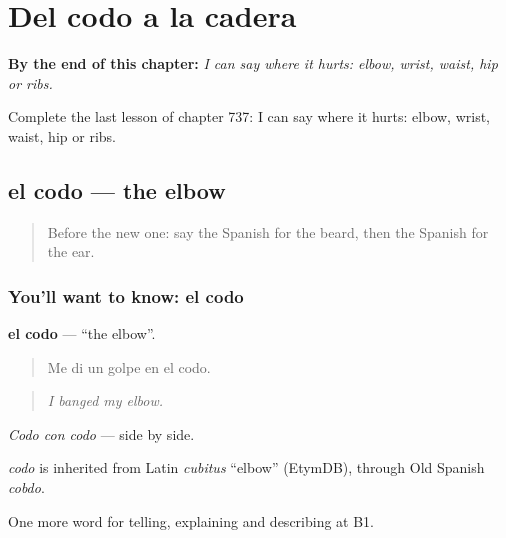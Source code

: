 
\chapter{Del codo a la cadera}
\label{ch:es-del-codo-a-la-cadera}

\begin{chapteropening}
\textbf{By the end of this chapter:} \emph{I can say where it hurts: elbow, wrist, waist, hip or ribs.}

Complete the last lesson of chapter 737: I can say where it hurts: elbow, wrist, waist, hip or ribs.
\end{chapteropening}

\section[el codo]{el codo — the elbow}

\label{lesson:ES-C737-codo}



\begin{quote}
Before the new one: say the Spanish for the beard, then the Spanish for the ear.
\end{quote}

\subsection*{You'll want to know: el codo}
\textbf{el codo} — \textquotedblleft{}the elbow\textquotedblright{}.

\begin{quote}
Me di un golpe en el codo.
\end{quote}

\begin{quote}
\emph{I banged my elbow.}
\end{quote}

\emph{Codo con codo} — side by side.

\begin{cousinweb}
\emph{codo} is inherited from Latin \emph{cubitus} \textquotedblleft{}elbow\textquotedblright{} (EtymDB), through Old Spanish \emph{cobdo}.
\end{cousinweb}

\begin{grammarlens}[title={What you've built}]
One more word for telling, explaining and describing at B1.
\end{grammarlens}


